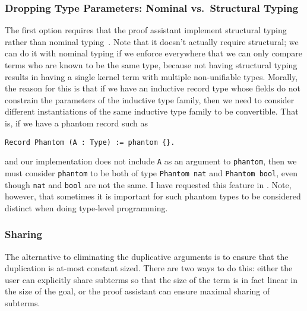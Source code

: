 \subsubsection{Dropping Type Parameters: Nominal vs.\ Structural Typing} \label{sec:nominal-vs-structural} \label{sec:dropping-constructor-parameters}
The first option requires that the proof assistant implement structural typing rather than nominal typing~\cite[19.3 Nominal and Structural Type Systems]{tapl}.
Note that it doesn't actually require structural; we can do it with nominal typing if we enforce everywhere that we can only compare terms who are known to be the same type, because not having structural typing results in having a single kernel term with multiple non-unifiable types.
Morally, the reason for this is that if we have an inductive record type whose fields do not constrain the parameters of the inductive type family, then we need to consider different instantiations of the same inductive type family to be convertible.
That is, if we have a phantom record such as
\begin{verbatim}
Record Phantom (A : Type) := phantom {}.
\end{verbatim}
and our implementation does not include \texttt{A} as an argument to \texttt{phantom}, then we must consider \texttt{phantom} to be both of type \texttt{Phantom nat} and \texttt{Phantom bool}, even though \texttt{nat} and \texttt{bool} are not the same.
I have requested this feature in .
Note, however, that sometimes it is important for such phantom types to be considered distinct when doing type-level programming.

\subsubsection{Sharing} \label{sec:sharing}
The alternative to eliminating the duplicative arguments is to ensure that the duplication is at-most constant sized.
There are two ways to do this: either the user can explicitly share subterms so that the size of the term is in fact linear in the size of the goal, or the proof assistant can ensure maximal sharing of subterms.

